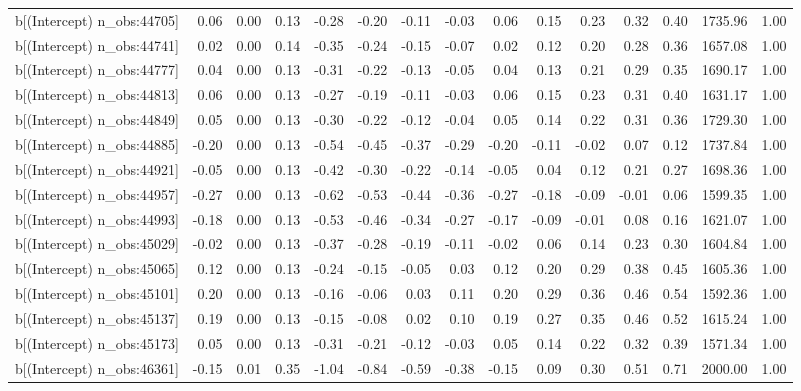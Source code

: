 \begin{table}[ht]
\begin{tabular}{rrrrrrrrrrrrrrr}
  b[(Intercept) n\_obs:44705] & 0.06 & 0.00 & 0.13 & -0.28 & -0.20 & -0.11 & -0.03 & 0.06 & 0.15 & 0.23 & 0.32 & 0.40 & 1735.96 & 1.00 \\ 
  b[(Intercept) n\_obs:44741] & 0.02 & 0.00 & 0.14 & -0.35 & -0.24 & -0.15 & -0.07 & 0.02 & 0.12 & 0.20 & 0.28 & 0.36 & 1657.08 & 1.00 \\ 
  b[(Intercept) n\_obs:44777] & 0.04 & 0.00 & 0.13 & -0.31 & -0.22 & -0.13 & -0.05 & 0.04 & 0.13 & 0.21 & 0.29 & 0.35 & 1690.17 & 1.00 \\ 
  b[(Intercept) n\_obs:44813] & 0.06 & 0.00 & 0.13 & -0.27 & -0.19 & -0.11 & -0.03 & 0.06 & 0.15 & 0.23 & 0.31 & 0.40 & 1631.17 & 1.00 \\ 
  b[(Intercept) n\_obs:44849] & 0.05 & 0.00 & 0.13 & -0.30 & -0.22 & -0.12 & -0.04 & 0.05 & 0.14 & 0.22 & 0.31 & 0.36 & 1729.30 & 1.00 \\ 
  b[(Intercept) n\_obs:44885] & -0.20 & 0.00 & 0.13 & -0.54 & -0.45 & -0.37 & -0.29 & -0.20 & -0.11 & -0.02 & 0.07 & 0.12 & 1737.84 & 1.00 \\ 
  b[(Intercept) n\_obs:44921] & -0.05 & 0.00 & 0.13 & -0.42 & -0.30 & -0.22 & -0.14 & -0.05 & 0.04 & 0.12 & 0.21 & 0.27 & 1698.36 & 1.00 \\ 
  b[(Intercept) n\_obs:44957] & -0.27 & 0.00 & 0.13 & -0.62 & -0.53 & -0.44 & -0.36 & -0.27 & -0.18 & -0.09 & -0.01 & 0.06 & 1599.35 & 1.00 \\ 
  b[(Intercept) n\_obs:44993] & -0.18 & 0.00 & 0.13 & -0.53 & -0.46 & -0.34 & -0.27 & -0.17 & -0.09 & -0.01 & 0.08 & 0.16 & 1621.07 & 1.00 \\ 
  b[(Intercept) n\_obs:45029] & -0.02 & 0.00 & 0.13 & -0.37 & -0.28 & -0.19 & -0.11 & -0.02 & 0.06 & 0.14 & 0.23 & 0.30 & 1604.84 & 1.00 \\ 
  b[(Intercept) n\_obs:45065] & 0.12 & 0.00 & 0.13 & -0.24 & -0.15 & -0.05 & 0.03 & 0.12 & 0.20 & 0.29 & 0.38 & 0.45 & 1605.36 & 1.00 \\ 
  b[(Intercept) n\_obs:45101] & 0.20 & 0.00 & 0.13 & -0.16 & -0.06 & 0.03 & 0.11 & 0.20 & 0.29 & 0.36 & 0.46 & 0.54 & 1592.36 & 1.00 \\ 
  b[(Intercept) n\_obs:45137] & 0.19 & 0.00 & 0.13 & -0.15 & -0.08 & 0.02 & 0.10 & 0.19 & 0.27 & 0.35 & 0.46 & 0.52 & 1615.24 & 1.00 \\ 
  b[(Intercept) n\_obs:45173] & 0.05 & 0.00 & 0.13 & -0.31 & -0.21 & -0.12 & -0.03 & 0.05 & 0.14 & 0.22 & 0.32 & 0.39 & 1571.34 & 1.00 \\ 
  b[(Intercept) n\_obs:46361] & -0.15 & 0.01 & 0.35 & -1.04 & -0.84 & -0.59 & -0.38 & -0.15 & 0.09 & 0.30 & 0.51 & 0.71 & 2000.00 & 1.00 \\ 

\end{tabular}
\end{table}
